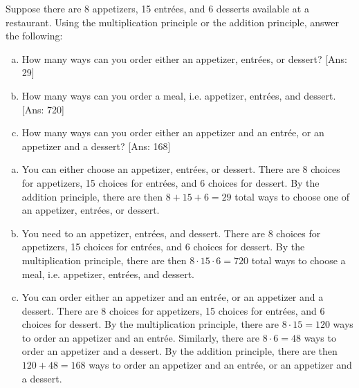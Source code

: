 \documentclass[11pt,letterpaper]{article}
\begin{document}

 Suppose there are 8 appetizers, 15 entr\'ees, and 6 desserts available at a restaurant. Using the multiplication principle or the addition principle, answer the following: 
	\begin{enumerate}[(a)]
	\item How many ways can you order either an appetizer, entr\'ees, or dessert? [Ans: 29]
	\item How many ways can you order a meal, i.e. appetizer, entr\'ees, and dessert. [Ans: 720]
	\item How many ways can you order either an appetizer and an entr\'ee, or an appetizer and a dessert? [Ans: 168]
	\end{enumerate} \pspace

\sol 
\begin{enumerate}[(a)]
\item You can either choose an appetizer, entr\'ees, or dessert. There are 8 choices for appetizers, 15 choices for entr\'ees, and 6 choices for dessert. By the addition principle, there are then $8 + 15 + 6= 29$ total ways to choose one of an appetizer, entr\'ees, or dessert. \pspace

\item You need to an appetizer, entr\'ees, and dessert. There are 8 choices for appetizers, 15 choices for entr\'ees, and 6 choices for dessert. By the multiplication principle, there are then $8 \cdot 15 \cdot 6= 720$ total ways to choose a meal, i.e. appetizer, entr\'ees, and dessert. \pspace

\item You can order either an appetizer and an entr\'ee, or an appetizer and a dessert. There are 8 choices for appetizers, 15 choices for entr\'ees, and 6 choices for dessert. By the multiplication principle, there are $8 \cdot 15= 120$ ways to order an appetizer and an entr\'ee. Similarly, there are $8 \cdot 6= 48$ ways to order an appetizer and a dessert. By the addition principle, there are then $120 + 48= 168$ ways to order an appetizer and an entr\'ee, or an appetizer and a dessert. 
\end{enumerate}



\newpage
\end{document}
